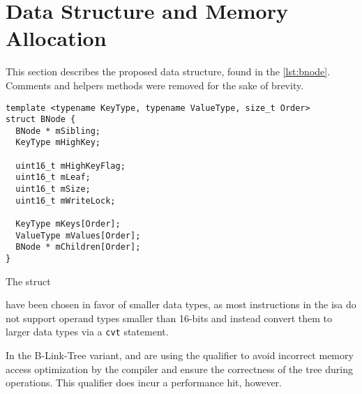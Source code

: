 \section{Data Structure and Memory Allocation}

This section describes the proposed data structure, found in the \cref{lst:bnode}. Comments and helpers methods were removed for the sake of brevity.

\begin{listing}
  \begin{verbatim}
template <typename KeyType, typename ValueType, size_t Order>
struct BNode {
  BNode * mSibling;
  KeyType mHighKey;

  uint16_t mHighKeyFlag;
  uint16_t mLeaf;
  uint16_t mSize;
  uint16_t mWriteLock;

  KeyType mKeys[Order];
  ValueType mValues[Order];
  BNode * mChildren[Order]; 
}
    \end{verbatim}
  \caption{The  struct}\label{lst:bnode}
\end{listing}

 have been chosen in favor of smaller data types, as most instructions in the \acrshort{isa} do not support operand types smaller than 16-bits and instead convert them to larger data types via a \texttt{cvt} statement.

In the B-Link-Tree variant,  and  are using the  qualifier to avoid incorrect memory access optimization by the compiler and ensure the correctness of the tree during operations. This qualifier does incur a performance hit, however.
